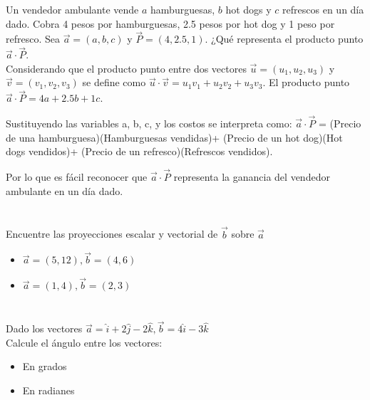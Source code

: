 \documentclass[12pt]{article}
\begin{document}
Un vendedor ambulante vende $a$ hamburguesas, $b$ hot dogs y $c$ refrescos en un día dado. Cobra 4 pesos por hamburguesas, 2.5 pesos por hot dog y 1 peso por refresco. Sea $\vec{a}=(a,b,c)$ y $\vec{P}=(4,2.5,1)$. ¿Qué representa el producto punto $\vec{a} \cdot \vec{P}$. \\

Considerando que el producto punto entre dos vectores $\vec{u} = (u_1, u_2, u_3)$ y  $\vec{v} = (v_1, v_2, v_3)$ se define como $\vec{u} \cdot \vec{v} = u_1v_1 + u_2v_2+u_3v_3$. El producto punto  $\vec{a} \cdot \vec{P} = 4a+ 2.5b+1c$.

Sustituyendo las variables a, b, c, y los costos se interpreta como:
$\vec{a} \cdot \vec{P}$ = (Precio de una hamburguesa)(Hamburguesas vendidas)+ (Precio de un hot dog)(Hot dogs vendidos)+ (Precio de un refresco)(Refrescos vendidos).

Por lo que es fácil reconocer que $\vec{a} \cdot \vec{P}$ representa la ganancia del vendedor ambulante en un día dado.


\section{}

Encuentre las proyecciones escalar y vectorial de $\vec{b}$ sobre $\vec{a}$

\begin{itemize}
  
\item $\vec{a}= (5,12), \vec{b}=(4,6)$
  
\item $\vec{a}= (1,4), \vec{b}=(2,3)$
  
\end{itemize}

\section{}

Dado los vectores $\vec{a} = \hat{i} + 2\hat{j}-2\hat{k}, \vec{b} = 4\hat{i} -3\hat{k}$ \\
Calcule el ángulo entre los vectores:

\begin{itemize}

\item En grados

\item En radianes

\end{itemize}
\end{document}

